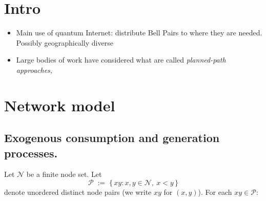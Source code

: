 \documentclass[11pt]{article}
\newcommand{\Ncal}{\mathcal{N}}
\newcommand{\Pairs}{\mathcal{P}} %
\begin{document}
\begin{abstract}
\end{abstract}


\section{Intro}

\begin{itemize}

\item Main use of quantum Internet: distribute Bell Pairs to where they are needed.  Possibly geographically diverse

\item Large bodies of work have considered what are called \em{planned-path} approaches, 
\end{itemize}
\section{Network model}

\subsection{Exogenous consumption and generation processes.} Let $\Ncal$ be a finite node set. Let
\[
\Pairs \;:=\; \{\, xy : x,y\in\Ncal,\ x<y \,\}
\]
denote unordered distinct node pairs (we write $xy$ for $(x,y)$). For each $xy\in\Pairs$:
\end{document}
